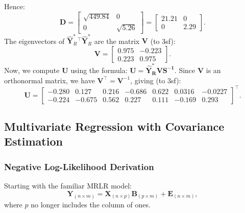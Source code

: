\documentclass[11pt]{report} %
\begin{document}
Hence:
\[
\mathbf{D} = 
\begin{bmatrix}
\sqrt{449.84} & 0 \\
0 & \sqrt{5.26}
\end{bmatrix}
=
\begin{bmatrix}
21.21   & 0 \\
0 & 2.29
\end{bmatrix}.
\]
The eigenvectors of \( \hat{\mathbf{Y}}_R^*{}^\top \hat{\mathbf{Y}}_R^* \) are the matrix \( \mathbf{V} \) (to 3sf):
\[
\mathbf{V} =
\begin{bmatrix}
0.975 & -0.223 \\
0.223 & 0.975
\end{bmatrix}.
\]
Now, we compute \( \mathbf{U} \) using the formula: $\mathbf{U} = \mathbf{\hat{Y}^*_R V S^{-1}}$.
Since \( \mathbf{V} \) is an orthonormal matrix, we have \( \mathbf{V}^\top = \mathbf{V}^{-1} \), giving (to 3sf):
\[
\mathbf{U} =
\begin{bmatrix}
-0.280 & 0.127 & 0.216 & -0.686 & 0.622 & 0.0316 & -0.0227 \\
-0.224 & -0.675 & 0.562 & 0.227 & 0.111 & -0.169 & 0.293
\end{bmatrix}^{\top}.
\]

\subsection{Multivariate Regression with Covariance Estimation}
\subsubsection{Negative Log-Likelihood Derivation}
\label{NLL}
Starting with the familiar MRLR model:
\[
\mathbf{Y}_{(n\times m)} = \mathbf{X}_{(n \times p)} \mathbf{B}_{(p \times m)} + \mathbf{E}_{(n \times m)},
\]
where $p$ no longer includes the column of ones.
\end{document}
